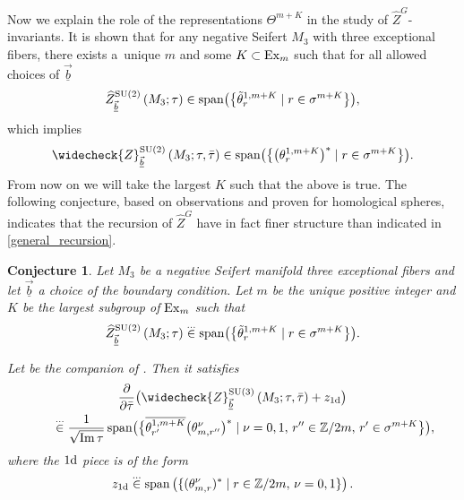 \documentclass[10pt,a4paper]{amsart}
\newcommand{\ZZ}{\mathbb{Z}}
\newcommand{\Zhlong}[3]{\ensuremath{\widehat{Z}^{#1}_{#2}\left(#3;\tau\right)}}
\newcommand{\Zchlong}[3]{\ensuremath{\widecheck{Z}^{#1}_{#2}\left(#3;\tau,\bar{\tau}\right)}}
\def\bv{{\vec{\underline{b}}}}
\newtheorem{conj}[thm]{Conjecture}
\theoremstyle{definition}
\numberwithin{equation}{section}
\begin{document}
Now we explain the role of the representations $\Theta^{m+K}$ in the study of $\widehat Z^G$-invariants.
It is shown \cite{bringmann2019quantum,cheng20193d} that for any negative Seifert $M_3$ with three exceptional fibers, there exists a~unique $m$ and some $K\subset {\rm Ex}_m$ such that for all allowed choices of $\bv$
\begin{equation}\label{eqn:intro_Weyl1}
\Zhlong{{\rm SU}(2)}{\bv}{M_3} \in \operatorname{span}\bigl(
 \bigl\{\tilde\theta_{r}^{1,m+K}\mid r \in \sigma^{m+K} \bigr\}\bigr),
\end{equation}
 which implies
\begin{equation}\label{eqn:intro_Weyl2}
 \Zchlong{{\rm SU}(2)}{\bv}{M_3} \in \operatorname{span}
 \bigl(\bigl\{\bigl(\theta^{1,m+K}_r\bigr)^\ast\mid r \in \sigma^{m+K} \bigr\}\bigr).
\end{equation}
 From now on we will take the largest $K$ such that the above is true. The following conjecture, based on observations and proven for homological spheres, indicates that the recursion of $\widehat Z^G$ have in fact finer structure than indicated in \eqref{general_recursion}.
\begin{conj}\label{conj_rec}
Let $M_3$ be a negative Seifert manifold three exceptional fibers and let $\bv$ a choice of the boundary condition. Let $m$ be the unique positive integer and $K$ be the largest subgroup of ${\rm Ex}_m$ such that
\[
 \Zhlong{{\rm SU}(2)}{\bv}{M_3} \stackrel{\dots}{\in} \operatorname{span}\bigl(
 \bigl\{\tilde\theta_{r}^{1,m+K}\mid r \in \sigma^{m+K} \bigr\}\bigr) .
\]

Let \smash{$\Zchlong{{\rm SU}(3)}{\bv}{M_3}$} be the companion of \smash{$\widehat Z^{{\rm SU}(3)}_{\bv}(\tau;M_3)$}. Then it satisfies
\begin{gather}
 {\frac{\partial}{ \partial \bar \tau}}
 \bigl( \Zchlong{{\rm SU}(3)}{\bv}{M_3} + z_{1\rm d}\bigr)\nonumber \\
 \qquad\stackrel{\dots}{\in}
 {\frac{1}{\sqrt{\operatorname{Im} \tau}}} \operatorname{span}\bigl(\bigl\{ \overline{\theta^{1,m+K}_{r'}} \bigl({\theta^{\nu}_{m,r''}}\bigr)^\ast \mid \nu=0,1, \,r'' \in \ZZ/2m,\, r' \in \sigma^{m+K} \bigr\} \bigr),\label{eqn:conj:recursive}
\end{gather}
where the $1\rm d$ piece is of the form
\begin{equation}\label{intro_1dpiece}
 z_{1\rm d}\stackrel{\dots}{\in} \operatorname{span}\left(\{ ({\theta^{\nu}_{m,r}})^\ast \mid r \in \ZZ/2m,\, \nu=0,1 \} \right).
\end{equation}
\end{conj}
\end{document}
